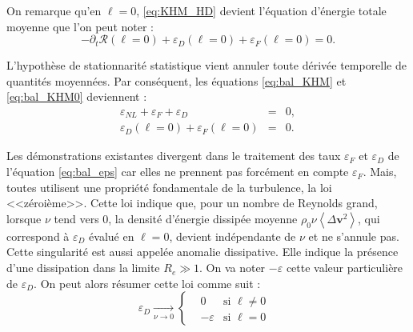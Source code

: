 On remarque qu'en $\boldsymbol{\ell} = 0$, \eqref{eq:KHM_HD} devient l'équation d'énergie totale moyenne que l'on peut noter : 
\begin{equation}
     \label{eq:bal_KHM0} -  \partial_t \mathcal{R}(\boldsymbol{\ell} =0)  + \varepsilon_{D}(\boldsymbol{\ell} =0) +  \varepsilon_{F}(\boldsymbol{\ell} =0) = 0  
.\end{equation} 

L'hypothèse de stationnarité statistique vient annuler toute dérivée temporelle de quantités moyennées. Par conséquent, les équations \eqref{eq:bal_KHM} et \eqref{eq:bal_KHM0} deviennent :  
\begin{eqnarray}
    \label{eq:bal_eps}\varepsilon_{NL} + \varepsilon_{F} + \varepsilon_{D} &=& 0 ,\\
    \label{eq:bal_eps0} \varepsilon_{D}(\boldsymbol{\ell} =0) +  \varepsilon_{F}(\boldsymbol{\ell} =0) &=& 0
.\end{eqnarray}


Les démonstrations existantes divergent dans le traitement des taux $\varepsilon_{F}$ et $\varepsilon_{D}$ de l'équation \eqref{eq:bal_eps} car elles ne prennent pas forcément en compte $\varepsilon_{F}$. Mais, toutes utilisent une propriété fondamentale de la turbulence, la loi <<zéroième>>. Cette loi indique que, pour un nombre de Reynolds grand, lorsque $\nu$ tend vers 0, la densité d'énergie dissipée moyenne $\rho_0 \nu  \left<\Delta\boldsymbol{v}^2\right>$, qui correspond à  $\varepsilon_D$ évalué en $\boldsymbol{\ell} =0$, devient indépendante de $\nu$ et ne s'annule pas. Cette singularité est aussi appelée anomalie dissipative. Elle indique la présence d'une dissipation dans la limite $R_e \gg 1$. On va noter $-\varepsilon$ cette valeur particulière de  $\varepsilon_D$. On peut alors résumer cette loi comme suit : 
\begin{equation}
 \label{eq:zero}  \varepsilon_D  \xrightarrow[\nu \rightarrow 0]{} \left\{
    \begin{split}
    & 0 & \textrm{si $\boldsymbol{\ell} \neq 0$ } \\
& - \varepsilon &  \textrm{si $\boldsymbol{\ell} =0$ } 
\end{split}
\right.
\end{equation}

